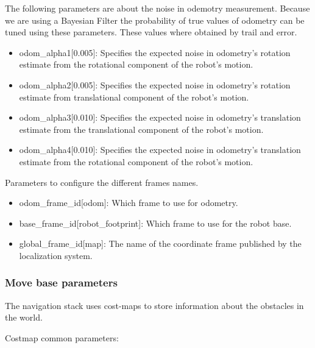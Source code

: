 \documentclass[10pt,journal,compsoc]{IEEEtran}
\begin{document}
The following parameters are about the noise in odemotry measurement. Because we are using a Bayesian Filter the probability of true values of odometry can be tuned using these parameters. These values where obtained by trail and error.

\begin{itemize}
\item odom\_alpha1[0.005]: Specifies the expected noise in odometry's rotation estimate from the rotational component of the robot's motion.
\item odom\_alpha2[0.005]: Specifies the expected noise in odometry's rotation estimate from translational component of the robot's motion. 
\item odom\_alpha3[0.010]: Specifies the expected noise in odometry's translation estimate from the translational component of the robot's motion. 
\item odom\_alpha4[0.010]: Specifies the expected noise in odometry's translation estimate from the rotational component of the robot's motion.
\end{itemize}

Parameters to configure the different frames names.

\begin{itemize}
\item odom\_frame\_id[odom]: Which frame to use for odometry.
\item base\_frame\_id[robot\_footprint]: Which frame to use for the robot base.
\item global\_frame\_id[map]: The name of the coordinate frame published by the localization system.
\end{itemize}

\subsubsection{Move base parameters}

The navigation stack uses cost-maps to store information about the obstacles in the world.


Costmap common parameters:
\end{document}
